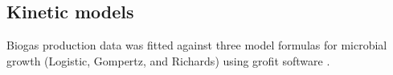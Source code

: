 \subsection{Kinetic models}
Biogas production data was fitted against three model formulas for microbial growth (Logistic, Gompertz, and Richards) using grofit software . 
